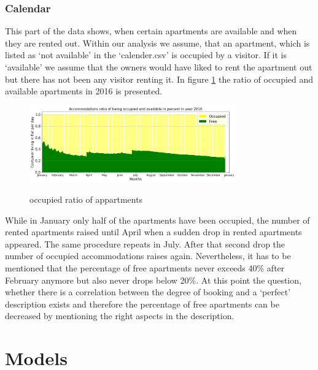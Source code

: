 \documentclass[journal]{IEEEtran}
\begin{document}
\subsubsection{Calendar}
\noindent This part of the data shows, when certain apartments are available and when they are rented out. Within our analysis we assume, that an apartment, which is listed as ‘not available’ in the ‘calender.csv’ is occupied by a visitor. If it is ‘available’ we assume that the owners would have liked to rent the apartment out but there has not been any visitor renting it. In figure \ref{occupied_ratio_appartments} the ratio of occupied and available apartments in 2016 is presented.
%
\begin{figure}
  \begin{center}
  \includegraphics[width=3.5in]{photo/11_acc_ratio_occupied.png}\\
  \caption{occupied ratio of appartments}\label{occupied_ratio_appartments}
  \end{center}
\end{figure}
%
While in January only half of the apartments have been occupied, the number of rented apartments raised until April when a sudden drop in rented apartments appeared. The same procedure repeats in July. After that second drop the number of occupied accommodations raises again. Nevertheless, it has to be mentioned that the percentage of free apartments never exceeds 40\% after February anymore but also never drops below 20\%. At this point the question, whether there is a correlation between the degree of booking and a ‘perfect’ description exists and therefore the percentage of free apartments can be decreased by mentioning the right aspects in the description. 

\section{Models}
\end{document}
